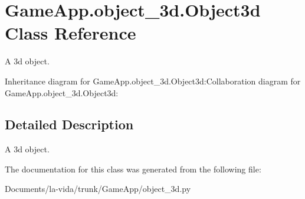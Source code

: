 \hypertarget{classGameApp_1_1object__3d_1_1Object3d}{
\section{GameApp.object\_\-3d.Object3d Class Reference}
\label{classGameApp_1_1object__3d_1_1Object3d}
}
A 3d object.  


Inheritance diagram for GameApp.object\_\-3d.Object3d:Collaboration diagram for GameApp.object\_\-3d.Object3d:

\subsection{Detailed Description}
A 3d object. 

The documentation for this class was generated from the following file:\begin{CompactItemize}
\item 
Documents/la-vida/trunk/GameApp/object\_\-3d.py\end{CompactItemize}
